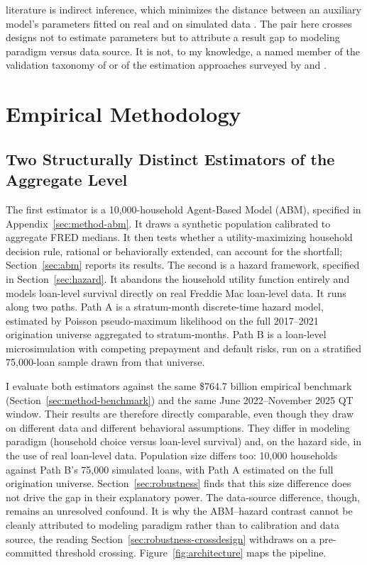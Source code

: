 \documentclass[12pt]{article}
\begin{document}
literature is indirect inference, which minimizes the distance between an auxiliary model's parameters fitted on real and on simulated data \citep{platt2020}. The pair here crosses designs not to estimate parameters but to attribute a result gap to modeling paradigm versus data source. It is not, to my knowledge, a named member of the validation taxonomy of \citet{fagiolo2007} or of the estimation approaches surveyed by \citet{grazzini2017} and \citet{platt2020}.
\section{Empirical Methodology}\label{sec:method}

\subsection{Two Structurally Distinct Estimators of the Aggregate Level}\label{sec:method-estimators}

The first estimator is a 10,000-household Agent-Based Model (ABM), specified in Appendix~\ref{sec:method-abm}. It draws a synthetic population calibrated to aggregate FRED medians. It then tests whether a utility-maximizing household decision rule, rational or behaviorally extended, can account for the shortfall; Section~\ref{sec:abm} reports its results. The second is a hazard framework, specified in Section~\ref{sec:hazard}. It abandons the household utility function entirely and models loan-level survival directly on real Freddie Mac loan-level data. It runs along two paths. Path A is a stratum-month discrete-time hazard model, estimated by Poisson pseudo-maximum likelihood on the full 2017--2021 origination universe aggregated to stratum-months. Path B is a loan-level microsimulation with competing prepayment and default risks, run on a stratified 75,000-loan sample drawn from that universe.

I evaluate both estimators against the same \$764.7 billion empirical benchmark (Section~\ref{sec:method-benchmark}) and the same June 2022--November 2025 QT window. Their results are therefore directly comparable, even though they draw on different data and different behavioral assumptions. They differ in modeling paradigm (household choice versus loan-level survival) and, on the hazard side, in the use of real loan-level data. Population size differs too: 10,000 households against Path B's 75,000 simulated loans, with Path A estimated on the full origination universe. Section~\ref{sec:robustness} finds that this size difference does not drive the gap in their explanatory power. The data-source difference, though, remains an unresolved confound. It is why the ABM--hazard contrast cannot be cleanly attributed to modeling paradigm rather than to calibration and data source, the reading Section~\ref{sec:robustness-crossdesign} withdraws on a pre-committed threshold crossing. Figure~\ref{fig:architecture} maps the pipeline.
\end{document}

